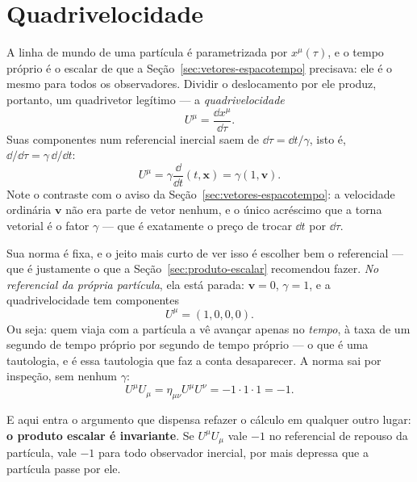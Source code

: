 \documentclass[12pt,a4paper,oneside]{book}
\theoremstyle{rgplain}
\theoremstyle{rgremark}
\begin{document}
\section{Quadrivelocidade}
\label{sec:quadrivelocidade}

A linha de mundo de uma partícula é parametrizada por $x^\mu(\tau)$, e o tempo
próprio é o escalar de que a Seção~\ref{sec:vetores-espacotempo} precisava: ele
é o mesmo para todos os observadores. Dividir o deslocamento por ele produz,
portanto, um quadrivetor legítimo --- a \emph{quadrivelocidade}
\[
  U^\mu=\frac{\dd x^\mu}{\dd\tau}.
\]
Suas componentes num referencial inercial saem de
$\dd\tau=\dd t/\gamma$, isto é, $\dd/\dd\tau=\gamma\,\dd/\dd t$:
\[
  U^\mu=\gamma\frac{\dd}{\dd t}(t,\bm x)=\gamma(1,\bm v).
\]
Note o contraste com o aviso da Seção~\ref{sec:vetores-espacotempo}: a
velocidade ordinária $\bm v$ não era parte de vetor nenhum, e o único
acréscimo que a torna vetorial é o fator $\gamma$ --- que é exatamente o
preço de trocar $\dd t$ por $\dd\tau$.

Sua norma é fixa, e o jeito mais curto de ver isso é escolher bem o
referencial --- que é justamente o que a Seção~\ref{sec:produto-escalar}
recomendou fazer. \emph{No referencial da própria partícula}, ela está parada:
$\bm v=0$, $\gamma=1$, e a quadrivelocidade tem componentes
\[
  U^\mu=(1,0,0,0).
\]
Ou seja: quem viaja com a partícula a vê avançar apenas no \emph{tempo}, à taxa
de um segundo de tempo próprio por segundo de tempo próprio --- o que é uma
tautologia, e é essa tautologia que faz a conta desaparecer. A norma sai por
inspeção, sem nenhum $\gamma$:
\[
  U^\mu U_\mu=\eta_{\mu\nu}U^\mu U^\nu=-1\cdot 1\cdot 1=-1 .
\]

E aqui entra o argumento que dispensa refazer o cálculo em qualquer outro
lugar: \textbf{o produto escalar é invariante}. Se $U^\mu U_\mu$ vale $-1$ no
referencial de repouso da partícula, vale $-1$ para todo observador inercial,
por mais depressa que a partícula passe por ele.
\end{document}
